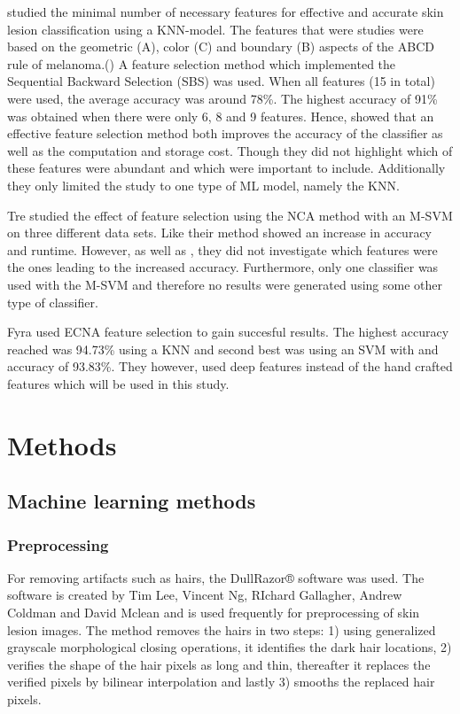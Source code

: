 \documentclass{kththesis}
\begin{document}
\parencite{MustafaSuleiman2017Fsus} studied the minimal number of necessary features for effective and accurate skin lesion classification using a KNN-model.  The features that were studies were based on the geometric (A), color (C)  and boundary (B) aspects of the ABCD rule of melanoma.(\parencite{MustafaSuleiman2017Fsus}) A feature selection method which implemented the Sequential Backward Selection (SBS) was used. When all features (15 in total) were used, the average accuracy was around 78\%. The highest accuracy of 91\% was obtained when there were only 6, 8 and 9 features. Hence, \parencite{MustafaSuleiman2017Fsus} showed that an effective feature selection method both improves the accuracy of the classifier as well as the computation and storage cost. Though they did not highlight which of these features were abundant and which were important to include. Additionally they only limited the study to one type of ML model, namely the KNN. 

Tre studied the effect of feature selection using the NCA method with an M-SVM on three different data sets. Like \parencite{MustafaSuleiman2017Fsus} their method showed an increase in accuracy and runtime. However, as well as \parencite{MustafaSuleiman2017Fsus}, they did not investigate which features were the ones leading to the increased accuracy. Furthermore, only one classifier was used with the M-SVM and therefore no results were generated using some other type of classifier. 

Fyra used ECNA feature selection to gain succesful results. The highest accuracy reached was 94.73\% using a KNN and second best was using an SVM with and accuracy of 93.83\%. They however, used deep features instead of the hand crafted features which will be used in this study.


\chapter{Methods}

\section{Machine learning methods}

\subsection{Preprocessing}

For removing artifacts such as hairs, the DullRazor® software was used. The software is created by Tim Lee, Vincent Ng, RIchard Gallagher, Andrew Coldman and David Mclean and is used frequently for preprocessing of skin lesion images. The method removes the hairs in two steps: 1) using generalized grayscale morphological closing operations, it identifies the dark hair locations, 2) verifies the shape of the hair pixels as long and thin, thereafter it replaces the verified pixels by bilinear interpolation and lastly 3) smooths the replaced hair pixels. \parencite{dermwebDullRazor} %
\end{document}
